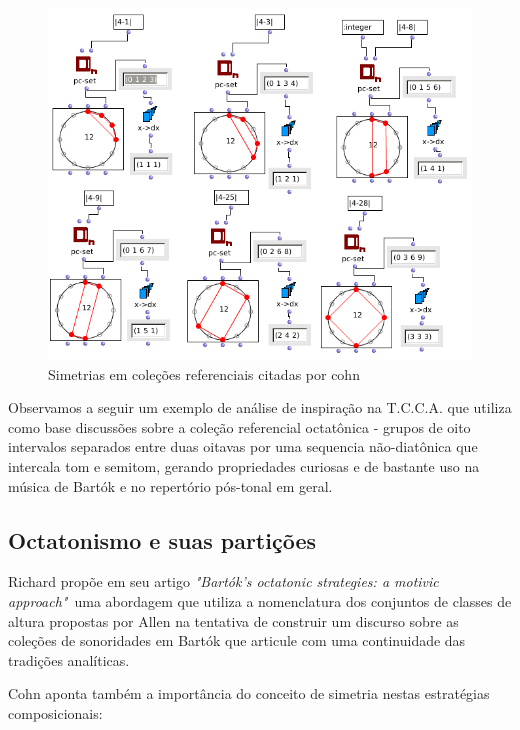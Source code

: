 \documentclass[
	12pt,				%
	openright,			%
	twoside,			%
	a4paper,			%
	english,			%
	french,				%
	spanish,			%
	brazil				%
	]{abntex2}
\begin{document}
\begin{figure}[!h]
	\caption{\label{fig_grafico} Simetrias em coleções referenciais citadas por cohn}
	\begin{center}
	    \includegraphics[scale=0.5]{axis/colecoes_simetricas.png}
	\end{center}
\end{figure}


Observamos a seguir um exemplo de análise de inspiração na T.C.C.A. que utiliza como base discussões sobre a coleção referencial octatônica - grupos de oito intervalos separados entre duas oitavas por uma sequencia não-diatônica que intercala tom e semitom, gerando propriedades curiosas e de bastante uso na música de Bartók e no repertório pós-tonal em geral.


\subsection{Octatonismo e suas partições}

Richard  propõe em seu artigo \textit{"Bartók's octatonic strategies: a motivic approach"}\ uma abordagem que utiliza a nomenclatura dos conjuntos de classes de altura propostas por Allen  na tentativa de construir um discurso sobre as coleções de sonoridades em Bartók que articule com uma continuidade das tradições analíticas.

Cohn aponta também a importância do conceito de simetria nestas estratégias composicionais:
\end{document}
